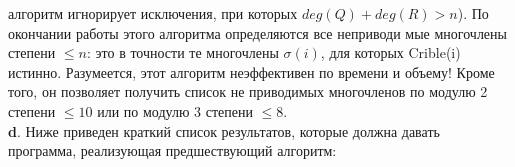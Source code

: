 \documentclass{../../template/mai_book}
\begin{document}
{алгоритм игнорирует исключения, при которых $deg(Q) + deg(R) > n$).\linebreak
По окончании работы этого алгоритма определяются все неприводи­
мые многочлены степени  $\leq n$: это в точности те многочлены $\sigma(i)$, для\linebreak
которых Crible(i) истинно. Разумеется, этот алгоритм неэффективен \linebreak
по времени и объему! Кроме того, он позволяет получить список не­\linebreak
приводимых многочленов по модулю 2 степени  $\leq 10$ или по модулю 3\linebreak
степени $\leq 8$.\\

\hspace*{15pt}\textbf{d}. Ниже приведен краткий список результатов, которые должна\linebreak
давать программа, реализующая предшествующий алгоритм:
\\

}
\end{document}
